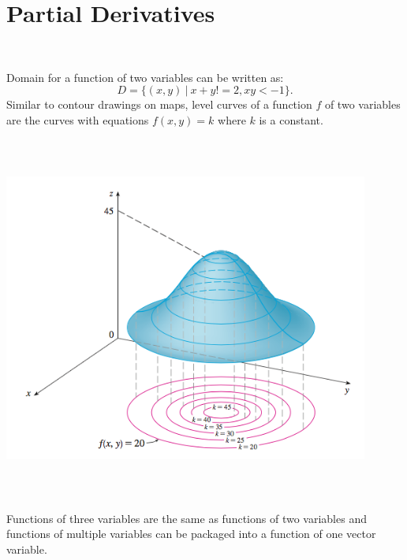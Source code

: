 \documentclass{article}
\begin{document}
\section*{Partial Derivatives}\

Domain for a function of two variables can be written as: 
\[D = \{(x,y)\:|\: x + y != 2, xy < -1\}.\]
Similar to contour drawings on maps, level curves of a function $f$ of two variables
are the curves with equations $f(x,y) = k$ where $k$ is a constant. 
\begin{center}
    \includegraphics[width=12cm,height=12cm, keepaspectratio]{LevelCurves.png}
\end{center}
Functions of three variables are the same as functions of two variables and
functions of multiple variables can be packaged into a function of one vector
variable. 
\end{document}
